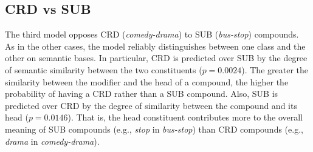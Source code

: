 \documentclass[output=paper]{langsci/langscibook}
\begin{document}
\begin{table}[p]
\caption{Results of the logit model opposing CRD (1) to SUB (0).\label{tab:reascrdsub}}
\end{table}

\subsection{CRD vs SUB}

The third model opposes CRD (\emph{comedy-drama}) to SUB (\emph{bus-stop}) compounds. As in the other cases, the model reliably distinguishes between one class and the other on semantic bases. In particular, CRD is predicted over SUB by the degree of semantic similarity between the two constituents ($p=0.0024$). The greater the similarity between the modifier and the head of a compound, the higher the probability of having a CRD rather than a SUB compound. Also, SUB is predicted over CRD by the degree of similarity between the compound and its head ($p=0.0146$). That is, the head constituent contributes more to the overall meaning of SUB compounds (e.g., \emph{stop} in \emph{bus-stop}) than CRD compounds (e.g., \emph{drama} in \emph{comedy-drama}).
\end{document}
